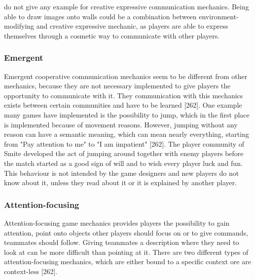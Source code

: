 \textcite{Toups2014ATheory} do not give any example for creative expressive communication mechanics. Being able to draw images onto walls could be a combination between environment-modifying and creative expressive mechanic, as players are able to express themselves through a cosmetic way to communicate with other players.


\subsubsection{Emergent}
\label{section:Emergent}

Emergent cooperative communication mechanics seem to be different from other mechanics, because they are not necessary implemented to give players the opportunity to communicate with it. They communication with this mechanics exists between certain communities and have to be learned \autocite{Toups2014ATheory}[262]. One example many games have implemented is the possibility to jump, which in the first place is implemented because of movement reasons. However, jumping without any reason can have a semantic meaning, which can mean nearly everything, starting from "Pay attention to me" to "I am impatient" \autocite{Toups2014ATheory}[262]. 
The player community of Smite developed the act of jumping around together with enemy players before the match started as a good sign of will and to wish every player luck and fun. This behaviour is not intended by the game designers and new players do not know about it, unless they read about it or it is explained by another player.

\subsubsection{Attention-focusing}
\label{section:Attention-focusing}

Attention-focusing game mechanics provides players the possibility to gain attention, point onto objects other players should focus on or to give commands, teammates should follow. Giving teammates a description where they need to look at can be more difficult than pointing at it. There are two different types of attention-focusing mechanics, which are either bound to a specific context ore are context-less \autocite{Toups2014ATheory}[262].


